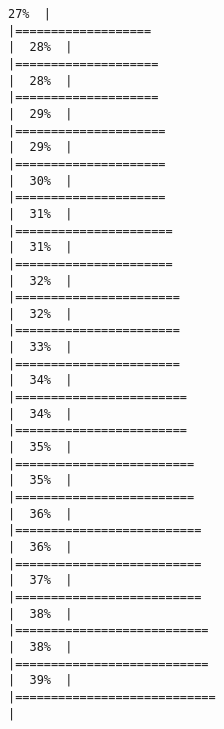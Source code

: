 \documentclass[
]{article}
\begin{document}
\begin{verbatim}
27%  |                                                                              |===================                                                   |  28%  |                                                                              |====================                                                  |  28%  |                                                                              |====================                                                  |  29%  |                                                                              |=====================                                                 |  29%  |                                                                              |=====================                                                 |  30%  |                                                                              |=====================                                                 |  31%  |                                                                              |======================                                                |  31%  |                                                                              |======================                                                |  32%  |                                                                              |=======================                                               |  32%  |                                                                              |=======================                                               |  33%  |                                                                              |=======================                                               |  34%  |                                                                              |========================                                              |  34%  |                                                                              |========================                                              |  35%  |                                                                              |=========================                                             |  35%  |                                                                              |=========================                                             |  36%  |                                                                              |==========================                                            |  36%  |                                                                              |==========================                                            |  37%  |                                                                              |==========================                                            |  38%  |                                                                              |===========================                                           |  38%  |                                                                              |===========================                                           |  39%  |                                                                              |============================                                          |  
\end{verbatim}
\end{document}
